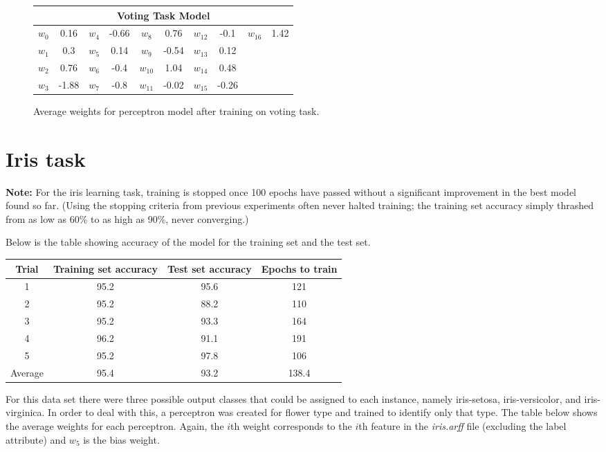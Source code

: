 \documentclass[12pt,letterpaper]{article}
\begin{document}
\begin{figure}[h]
\centering

\begin{tabular}{c|c||c|c||c|c||c|c||c|c}
\toprule
\multicolumn{10}{c}{Voting Task Model} \\
\hline
$w_{0}$	&	0.16	&	$w_{4}$	&	-0.66	&	$w_{8}$	&	0.76	&	$w_{12}$	&	-0.1	&	$w_{16}$	&	1.42\\
$w_{1}$	&	0.3	&	$w_{5}$	&	0.14	&	$w_{9}$	&	-0.54	&	$w_{13}$	&	0.12	&		&	\\
$w_{2}$	&	0.76	&	$w_{6}$	&	-0.4	&	$w_{10}$	&	1.04	&	$w_{14}$	&	0.48	&		&	\\
$w_{3}$	&	-1.88	&	$w_{7}$	&	-0.8	&	$w_{11}$	&	-0.02	&	$w_{15}$	&	-0.26	&		&	\\
\bottomrule
\end{tabular}
\caption{Average weights for perceptron model after training on voting task.}
\end{figure}

\section*{Iris task}

\textbf{Note:} For the iris learning task, training is stopped once 100 epochs have passed without a significant improvement in the best model found so far. (Using the stopping criteria from previous experiments often never halted training; the training set accuracy simply thrashed from as low as 60\% to as high as 90\%, never converging.)

Below is the table showing accuracy of the model for the training set and the test set.

\begin{center}
\begin{tabular}{cccc}
\toprule
Trial	&	Training set accuracy	&	Test set accuracy 	&	Epochs to train\\
\hline
1	&	95.2	&	95.6	&	121\\
2	&	95.2	&	88.2	&	110\\
3	&	95.2	&	93.3	&	164\\
4	&	96.2	&	91.1	&	191\\
5	&	95.2	&	97.8	&	106\\
Average	&	95.4	&	93.2	&	138.4\\
\bottomrule
\end{tabular}
\end{center}

For this data set there were three possible output classes that could be assigned to each instance, namely iris-setosa, iris-versicolor, and iris-virginica. In order to deal with this, a perceptron was created for flower type and trained to identify only that type. The table below shows the average weights for each perceptron. Again, the $i$th weight corresponds to the $i$th feature in the \emph{iris.arff} file (excluding the label attribute) and $w_5$ is the bias weight.
\end{document}

